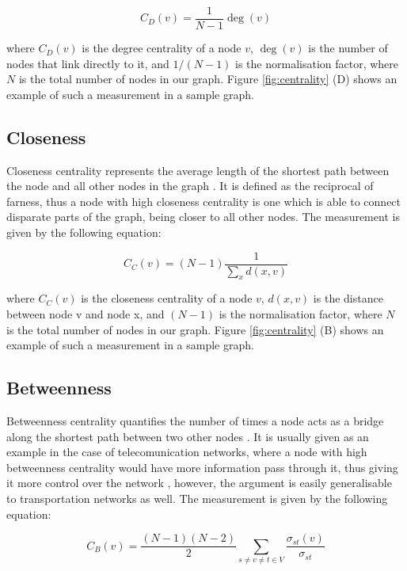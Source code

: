 \documentclass[bsc,frontabs,twoside,singlespacing,parskip,deptreport]{infthesis}
\begin{document}
\begin{equation}
	C_D(v) = \frac{1}{N-1}\deg(v)
\end{equation}

where $C_D(v)$ is the degree centrality of a node $v$, $\deg(v)$ is the number of nodes that link directly to it, and $1/(N-1)$ is the normalisation factor, where $N$ is the total number of nodes in our graph. Figure \ref{fig:centrality} (D) shows an example of such a measurement in a sample graph.

\subsection{Closeness}

Closeness centrality represents the average length of the shortest path between the node and all other nodes in the graph \cite{BavelasAlex1950CPiT}. It is defined as the reciprocal of farness, thus a node with high closeness centrality is one which is able to connect disparate parts of the graph, being closer to all other nodes. The measurement is given by the following equation:

\begin{equation}
	C_C(v)= (N-1)\frac{1}{\sum_x d(x,v)}
\end{equation}

where $C_C(v)$ is the closeness centrality of a node $v$, $d(x,v)$ is the distance between node v and node x, and $(N-1)$ is the normalisation factor, where $N$ is the total number of nodes in our graph. Figure \ref{fig:centrality} (B) shows an example of such a measurement in a sample graph.

\subsection{Betweenness}

Betweenness centrality quantifies the number of times a node acts as a bridge along the shortest path between two other nodes \cite{freeman}. It is usually given as an example in the case of telecomunication networks, where a node with high betweenness centrality would have more information pass through it, thus giving it more control over the network \cite{freeman}, however, the argument is easily generalisable to transportation networks as well. The measurement is given by the following equation:

\begin{equation}
	C_B(v) = \frac{(N-1)(N-2)}{2}\sum_{s \neq v \neq t \in V}\frac{\sigma_{st}(v)}{\sigma_{st}}
\end{equation}
\end{document}
